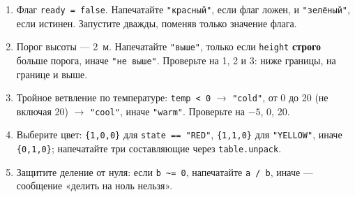 \begin{taskbox}
\begin{enumerate}
  \item Флаг \verb|ready = false|. Напечатайте \verb|"красный"|, если флаг ложен, и \verb|"зелёный"|, если истинен. Запустите дважды, поменяв только значение флага.
  \item Порог высоты --- 2~м. Напечатайте \verb|"выше"|, только если \verb|height| \textbf{строго} больше порога, иначе \verb|"не выше"|. Проверьте на 1, 2 и 3: ниже границы, на границе и выше.
  \item Тройное ветвление по температуре: \verb|temp < 0| $\to$ \verb|"cold"|, от 0 до 20 (не включая 20) $\to$ \verb|"cool"|, иначе \verb|"warm"|. Проверьте на $-5$, 0, 20.
  \item Выберите цвет: \verb|{1,0,0}| для \verb|state == "RED"|, \verb|{1,1,0}| для \verb|"YELLOW"|, иначе \verb|{0,1,0}|; напечатайте три составляющие через \verb|table.unpack|.
  \item Защитите деление от нуля: если \verb|b ~= 0|, напечатайте \verb|a / b|, иначе --- сообщение «делить на ноль нельзя».
\end{enumerate}
\end{taskbox}
